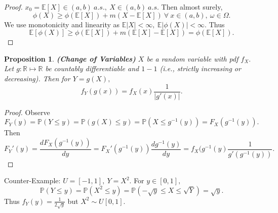 \documentclass{article}
\newcommand{\1}{\mathds{1}}
\newcommand{\R}{\mathbb{R}}
\newcommand{\E}{\mathbb{E}}
\newcommand{\PB}{\mathbb{P}}
\newcommand{\lf}{\left}
\newcommand{\rg}{\right}
\newcommand{\f}[2]{\frac{#1}{#2}}
\newcommand{\card}[1]{\lf\vert #1\rg\vert}
\newtheorem{proposition}[theorem]{Proposition}
\begin{document}
\begin{proof}
    $x_0=\E[X]\in (a,b)\ a.s.,\ X\in (a,b)\ a.s.$ Then almost surely,\ $$\phi(X)\geq \phi(\E[X])+m(X-\E[X])\ \forall\ x\in (a,b),\ \omega\in\Omega.$$ We use monotonicity and linearity as $\E\card{X}<\infty,\ \E\card{\phi(X)}<\infty.$ Thus $$\E[\phi(X)]\geq \phi(\E[X])+m(\E[X]-\E[X])=\phi(\E[X]).$$
\end{proof}
\begin{proposition}\textbf{(Change of Variables)}
    $X$ be a random variable with pdf $f_X.$ Let $g:\R\mapsto\R$ be countably differentiable and $1-1$ (i.e., strictly increasing or decreasing). Then for $Y=g(X),$ $$f_Y(g(x))=f_X(x)\f 1{\card{g'(x)}}.$$
\end{proposition}
\begin{proof}
    Observe $$F_Y(y)=\PB(Y\leq y)=\PB(g(X)\leq y)=\PB(X\leq g^{-1}(y))=F_X(g^{-1}(y)).$$ Then $$F_Y'(y)=\f{dF_X(g^{-1}(y))}{dy}=F_X'(g^{-1}(y))\f{dg^{-1}(y)}{dy}=f_X(g^{-1}(y)\f 1{g'(g^{-1}(y))}.$$
\end{proof}
Counter-Example: $U=[-1,1],\ Y=X^2.$ For $y\in [0,1],$ $$\PB(Y\leq y)=\PB(X^2\leq y)=\PB(-\sqrt{y}\leq X\leq \sqrt{Y})=\sqrt{y}.$$ Thus $f_Y(y)=\f 1{2\sqrt{y}}$ but $X^2\sim U[0,1].$
\end{document}
